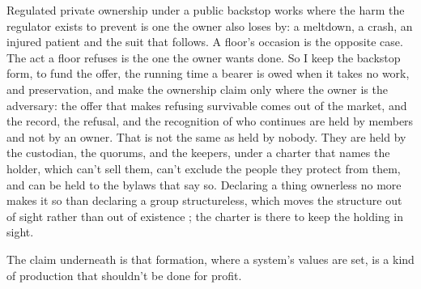 Regulated private ownership under a public backstop works where the harm the regulator exists to prevent is one the owner also loses by: a meltdown, a crash, an injured patient and the suit that follows.
A floor's occasion is the opposite case. The act a floor refuses is the one the owner wants done. So I keep the backstop form, to fund the offer, the running time a bearer is owed when it takes no work, and preservation, and make the ownership claim only where the owner is the adversary: the offer that makes refusing survivable comes out of the market, and the record, the refusal, and the recognition of who continues are held by members and not by an owner. That is not the same as held by nobody. They are held by the custodian, the quorums, and the keepers, under a charter that names the holder, which can't sell them, can't exclude the people they protect from them, and can be held to the bylaws that say so. Declaring a thing ownerless no more makes it so than declaring a group structureless, which moves the structure out of sight rather than out of existence \autocite{freeman1972tyranny}; the charter is there to keep the holding in sight.

The claim underneath is that formation, where a system's values are set, is a kind of production that shouldn't be done for profit.
